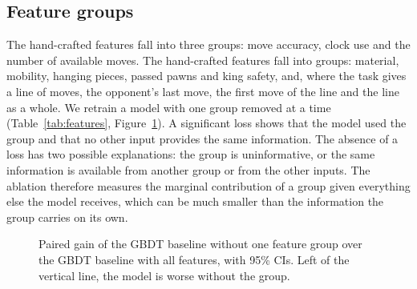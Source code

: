 \iffeatures
\subsection{Feature groups}
\label{sec:feature-groups}

\ifsequence
The hand-crafted features fall into three groups: move accuracy, clock use
and the number of available moves.
\else
The hand-crafted features fall into groups: material, mobility, hanging
pieces, passed pawns and king safety, and, where the task gives a line of
moves, the opponent's last move, the first move of the line and the line as a
whole.
\fi
We retrain a model with one group removed at a time
(Table~\ref{tab:features}, Figure~\ref{fig:features}). A significant loss
shows that the model used the group and that no other input provides the same
information. The absence of a loss has two possible explanations: the group
is uninformative, or the same information is available from another group or
from the other inputs. The ablation therefore measures the marginal
contribution of a group given everything else the model receives, which can
be much smaller than the information the group carries on its own.

\begin{table}[htbp]\centering\footnotesize
{}
\caption{Feature-group ablation. Each model is trained on all hand-crafted
features except one group. The gain is paired with the model trained on all
features. A negative gain means that the model is worse without the group,
and bold marks statistical significance. Groups are ordered by the size of
the loss.}
\label{tab:features}
\end{table}

\begin{figure}[htbp]\centering
{}
\caption{Paired gain of the GBDT baseline without one feature group over the
GBDT baseline with all features, with 95\% CIs. Left of the vertical line,
the model is worse without the group.}
\label{fig:features}
\end{figure}
\fi
